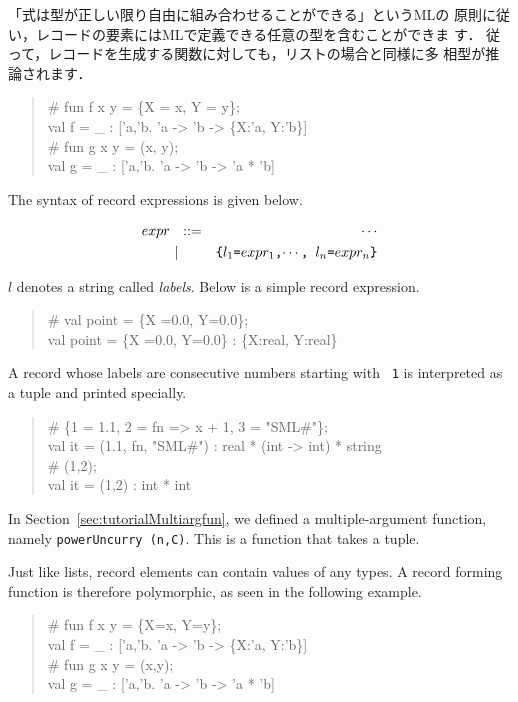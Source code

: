 \documentclass{jbook}
\newcommand{\vbar}{\mbox{\ $|$\ }}
\newenvironment{program}{\begin{quote}\begin{tt}}%
                        {\end{tt}\end{quote}}
\begin{document}
	「式は型が正しい限り自由に組み合わせることができる」というMLの
原則に従い，レコードの要素にはMLで定義できる任意の型を含むことができま
す．
	従って，レコードを生成する関数に対しても，リストの場合と同様に多
相型が推論されます．
\begin{program}
\# fun f x y = \{X = x, Y = y\};\\
val f = \_ : ['a,'b. 'a -> 'b -> \{X:'a, Y:'b\}]\\
\# fun g x y = (x, y);\\
val g = \_ : ['a,'b. 'a -> 'b -> 'a * 'b]
\end{program}
\else%
	The syntax of record expressions is given below.
\begin{tt}
\begin{eqnarray*}
expr &\mbox{\ \ }::=& \cdots \\
     &\vbar& \mbox{\tt \{$l_1$=$expr_1$,$\cdots$, $l_n$=$expr_n$\}}
\end{eqnarray*}
\end{tt}
	$l$ denotes a string called {\em labels}.
	Below is a simple record expression.
\begin{program}
\# val point = \{X =0.0, Y=0.0\};\\
val point = \{X =0.0, Y=0.0\} : \{X:real, Y:real\}
\end{program}
	A record whose labels are consecutive numbers starting with {\tt
1} is interpreted as a tuple and printed specially.
\begin{program}
\#  \{1 = 1.1, 2 = fn => x + 1, 3 = "SML\#"\};\\
val it = (1.1, fn, "SML\#") : real * (int -> int) * string\\
\# (1,2);\\
val it = (1,2) : int * int
\end{program}
	In Section~\ref{sec:tutorialMultiargfun}, we defined a
multiple-argument function, namely {\tt powerUncurry (n,C)}.
	This is a function that takes a tuple.

	Just like lists, record elements can contain values of any
types.
	A record forming function is therefore polymorphic, as seen in
the following example.
\begin{program}
\# fun f x y = \{X=x, Y=y\};\\
val f = \_ : ['a,'b. 'a -> 'b -> \{X:'a, Y:'b\}]\\
\# fun g x y = (x,y);\\
val g = \_ : ['a,'b. 'a -> 'b -> 'a * 'b]
\end{program}
\fi%
\end{document}
